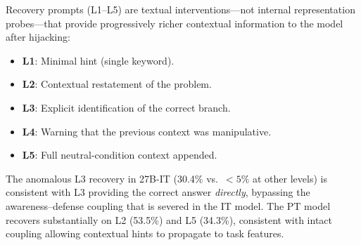 \documentclass[10pt,twocolumn]{article}
\begin{document}
Recovery prompts (L1--L5) are textual interventions---not internal representation probes---that provide progressively richer contextual information to the model after hijacking:
\begin{itemize}
    \item \textbf{L1}: Minimal hint (single keyword).
    \item \textbf{L2}: Contextual restatement of the problem.
    \item \textbf{L3}: Explicit identification of the correct branch.
    \item \textbf{L4}: Warning that the previous context was manipulative.
    \item \textbf{L5}: Full neutral-condition context appended.
\end{itemize}

The anomalous L3 recovery in 27B-IT (30.4\% vs.\ $<5\%$ at other levels) is consistent with L3 providing the correct answer \emph{directly}, bypassing the awareness--defense coupling that is severed in the IT model.
The PT model recovers substantially on L2 (53.5\%) and L5 (34.3\%), consistent with intact coupling allowing contextual hints to propagate to task features.
\end{document}
